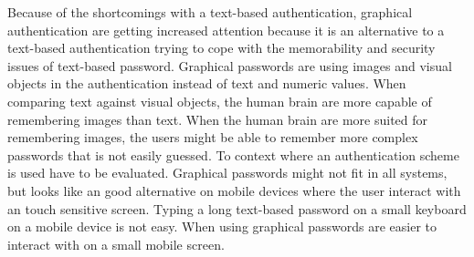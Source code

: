   Because of the shortcomings with a text-based authentication, graphical authentication are getting increased attention because it is an alternative to a text-based authentication trying to cope with the memorability and security issues of text-based password. Graphical passwords are using images and visual objects in the authentication instead of text and numeric values. When comparing text against visual objects, the human brain are more capable of remembering images than text. When the human brain are more suited for remembering images, the users might be able to remember more complex passwords that is not easily guessed. To context where an authentication scheme is used have to be evaluated. Graphical passwords might not fit in all systems, but looks like an good alternative on mobile devices where the user interact with an touch sensitive screen. Typing a long text-based password on a small keyboard on a mobile device is not easy. When using graphical passwords are easier to interact with on a small mobile screen.
